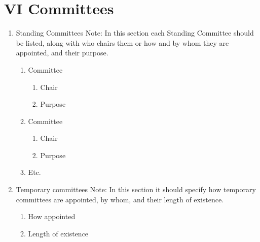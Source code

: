 
\section{VI \textendash{} Committees}
\begin{enumerate}[label=\Alph*.]
  \item Standing Committees Note:  In this section each Standing Committee
  should be listed, along with who chairs them or how and by whom they are
  appointed, and their purpose.
    \begin{enumerate}
      \item Committee
        \begin{enumerate}
          \item Chair
          \item Purpose
        \end{enumerate}
      \item Committee 
        \begin{enumerate}
          \item Chair
          \item Purpose
        \end{enumerate}
      \item Etc.
    \end{enumerate}
  \item Temporary committees Note:  In this section it should specify how
  temporary committees are appointed, by whom, and their length of existence.
    \begin{enumerate}
      \item How appointed
      \item Length of existence
    \end{enumerate}
\end{enumerate}

